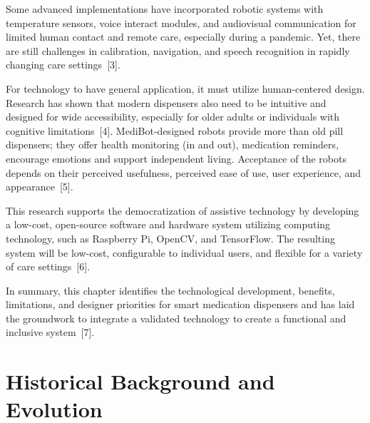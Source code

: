 Some advanced implementations have incorporated robotic systems with temperature sensors, voice interact modules, and audiovisual communication for limited human contact and remote care, especially during a pandemic. Yet, there are still challenges in calibration, navigation, and speech recognition in rapidly changing care settings~[3].

For technology to have general application, it must utilize human-centered design. Research has shown that modern dispensers also need to be intuitive and designed for wide accessibility, especially for older adults or individuals with cognitive limitations~[4]. MediBot-designed robots provide more than old pill dispensers; they offer health monitoring (in and out), medication reminders, encourage emotions and support independent living. Acceptance of the robots depends on their perceived usefulness, perceived ease of use, user experience, and appearance~[5].

This research supports the democratization of assistive technology by developing a low-cost, open-source software and hardware system utilizing computing technology, such as Raspberry Pi, OpenCV, and TensorFlow. The resulting system will be low-cost, configurable to individual users, and flexible for a variety of care settings~[6].

In summary, this chapter identifies the technological development, benefits, limitations, and designer priorities for smart medication dispensers and has laid the groundwork to integrate a validated technology to create a functional and inclusive system~[7].



\section{Historical Background and Evolution
}
\label{sec:Historical Background and Evolution
}

